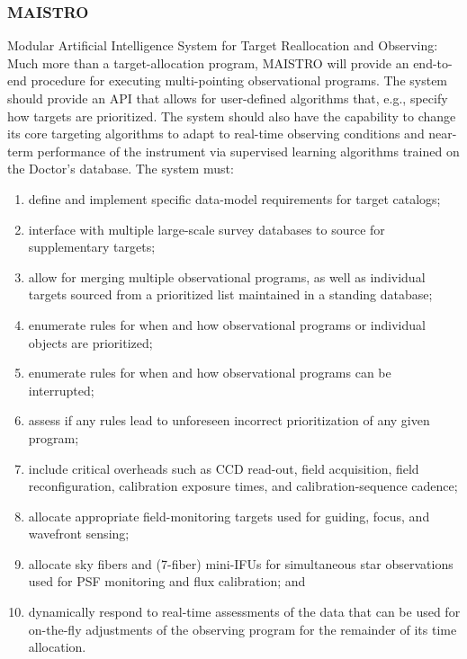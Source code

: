 \documentclass[oneside,11pt]{amsart}
\begin{document}
\subsubsection{MAISTRO}

Modular Artificial Intelligence System for Target Reallocation and
Observing: Much more than a target-allocation program, MAISTRO will
provide an end-to-end procedure for executing multi-pointing
observational programs. The system should provide an API that allows
for user-defined algorithms that, e.g., specify how targets are
prioritized. The system should also have the capability to change its
core targeting algorithms to adapt to real-time observing conditions
and near-term performance of the instrument via supervised learning
algorithms trained on the Doctor’s database. The system must:

\begin{enumerate}

\item define and implement specific data-model requirements for
target catalogs;

\item interface with multiple large-scale survey databases to source
for supplementary targets;

\item allow for merging multiple observational programs, as well as
individual targets sourced from a prioritized list maintained in a
standing database;

\item enumerate rules for when and how observational programs or
individual objects are prioritized;

\item enumerate rules for when and how observational programs can be
interrupted;

\item assess if any rules lead to unforeseen incorrect prioritization
of any given program;

\item include critical overheads such as CCD read-out, field
acquisition, field reconfiguration, calibration exposure times, and
calibration-sequence cadence;

\item allocate appropriate field-monitoring targets used for guiding,
focus, and wavefront sensing;

\item allocate sky fibers and (7-fiber) mini-IFUs for simultaneous
star observations used for PSF monitoring and flux calibration; and

\item dynamically respond to real-time assessments of the data that
can be used for on-the-fly adjustments of the observing program for
the remainder of its time allocation.

\end{enumerate}
\end{document}
